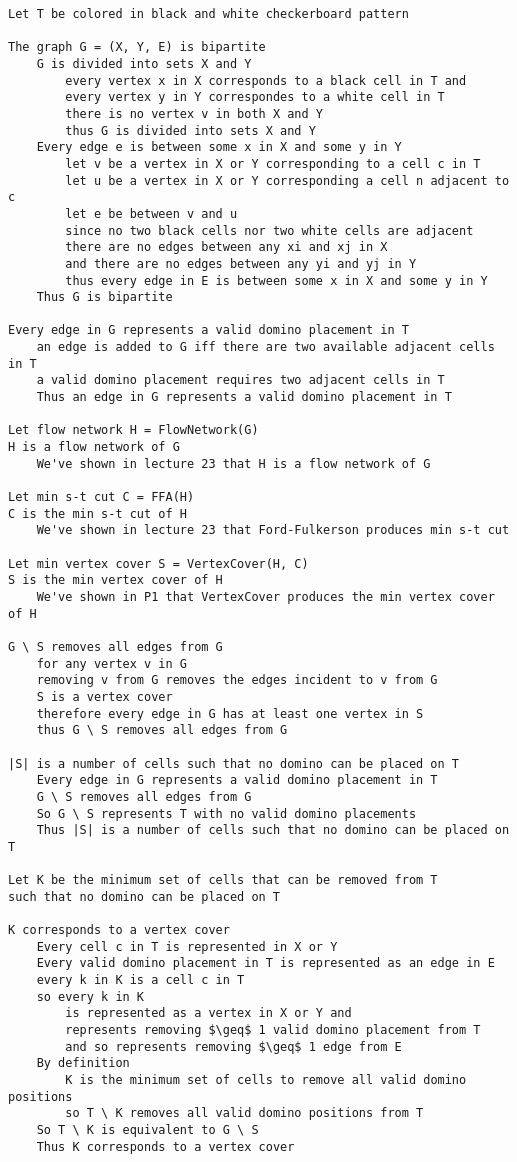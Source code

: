\documentclass[11pt]{article}
\begin{document}
\begin{lstlisting}[basicstyle=\small, mathescape=true]
Let T be colored in black and white checkerboard pattern

The graph G = (X, Y, E) is bipartite
	G is divided into sets X and Y
		every vertex x in X corresponds to a black cell in T and
		every vertex y in Y correspondes to a white cell in T 
		there is no vertex v in both X and Y
		thus G is divided into sets X and Y
	Every edge e is between some x in X and some y in Y
		let v be a vertex in X or Y corresponding to a cell c in T
		let u be a vertex in X or Y corresponding a cell n adjacent to c 
		let e be between v and u
		since no two black cells nor two white cells are adjacent
		there are no edges between any xi and xj in X
		and there are no edges between any yi and yj in Y
		thus every edge in E is between some x in X and some y in Y
	Thus G is bipartite

Every edge in G represents a valid domino placement in T
	an edge is added to G iff there are two available adjacent cells in T
	a valid domino placement requires two adjacent cells in T
	Thus an edge in G represents a valid domino placement in T
	
Let flow network H = FlowNetwork(G)
H is a flow network of G
	We've shown in lecture 23 that H is a flow network of G

Let min s-t cut C = FFA(H)
C is the min s-t cut of H
	We've shown in lecture 23 that Ford-Fulkerson produces min s-t cut

Let min vertex cover S = VertexCover(H, C)
S is the min vertex cover of H
	We've shown in P1 that VertexCover produces the min vertex cover of H

G \ S removes all edges from G
	for any vertex v in G
	removing v from G removes the edges incident to v from G
	S is a vertex cover
	therefore every edge in G has at least one vertex in S
	thus G \ S removes all edges from G

|S| is a number of cells such that no domino can be placed on T
	Every edge in G represents a valid domino placement in T
	G \ S removes all edges from G
	So G \ S represents T with no valid domino placements
	Thus |S| is a number of cells such that no domino can be placed on T
	
Let K be the minimum set of cells that can be removed from T
such that no domino can be placed on T

K corresponds to a vertex cover
	Every cell c in T is represented in X or Y
	Every valid domino placement in T is represented as an edge in E
	every k in K is a cell c in T
	so every k in K
		is represented as a vertex in X or Y and
		represents removing $\geq$ 1 valid domino placement from T
		and so represents removing $\geq$ 1 edge from E
	By definition 
		K is the minimum set of cells to remove all valid domino positions
		so T \ K removes all valid domino positions from T
	So T \ K is equivalent to G \ S
	Thus K corresponds to a vertex cover


\end{lstlisting}
\end{document}
